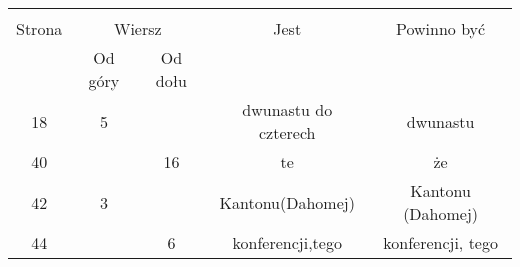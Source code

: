 \documentclass[a4paper,11pt]{article}
\begin{document}


%
%
%

\begin{center}
  \begin{tabular}{|c|c|c|c|c|}
    \hline
    & \multicolumn{2}{c|}{} & & \\
    Strona & \multicolumn{2}{c|}{Wiersz} & Jest
                              & Powinno być \\ \cline{2-3}
    & Od góry & Od dołu & & \\
    \hline
    18  &  5 & & dwunastu do czterech & dwunastu \\
    40  & & 16 & te & że \\
    42  &  3 & & Kantonu(Dahomej) & Kantonu (Dahomej) \\
    44  & &  6 & konferencji,tego & konferencji, tego \\
    \hline
  \end{tabular}
\end{center}





 {}



\end{document}

